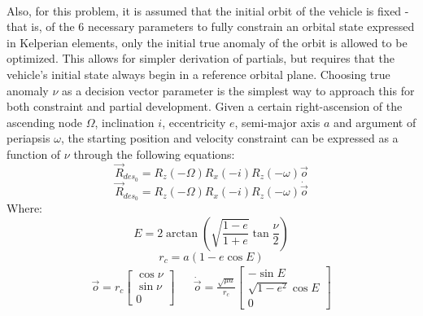 \paragraph{}
Also, for this problem, it is assumed that the initial orbit of the vehicle is fixed - that is, of the 6 necessary parameters to fully constrain an orbital state expressed in Kelperian elements, only the initial true anomaly of the orbit is allowed to be optimized. This allows for simpler derivation of partials, but requires that the vehicle's initial state always begin in a reference orbital plane. Choosing true anomaly $\nu$ as a decision vector parameter is the simplest way to approach this for both constraint and partial development. Given a certain right-ascension of the ascending node $\Omega$, inclination $i$, eccentricity $e$, semi-major axis $a$ and argument of periapsis $\omega$, the starting position and velocity constraint can be expressed as a function of $\nu$ through the following equations:
\begin{equation}\label{eq:state0pos}
\vec{R}_{des_0} = R_z (-\Omega) R_x(-i) R_z(-\omega) \vec{o}
\end{equation}
\begin{equation}\label{eq:state0vel}
\vec{R}_{des_0} = R_z (-\Omega) R_x(-i) R_z(-\omega) \dot{\vec{o}}
\end{equation}
Where:
\begin{equation}
E = 2 \arctan{\left(\sqrt{\frac{1-e}{1+e}} \tan{\frac{\nu}{2}}\right)}
\end{equation}
\begin{equation}
r_c = a(1 - e \cos{E})
\end{equation}
\begin{align}
\vec{o} = r_c \begin{bmatrix}
\cos {\nu} \\ \sin {\nu} \\ 0
\end{bmatrix} &&
\dot{\vec{o}} = \frac{\sqrt{\mu a}}{r_c} 
\begin{bmatrix}
-\sin {E} \\ \sqrt{1 - e^2} \cos{E} \\ 0
\end{bmatrix}
\end{align}

